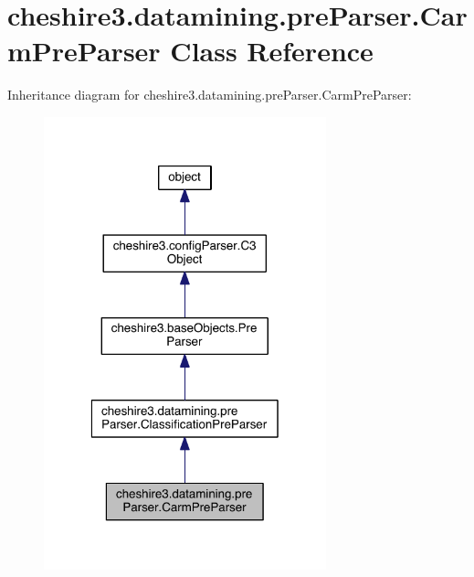\hypertarget{classcheshire3_1_1datamining_1_1pre_parser_1_1_carm_pre_parser}{\section{cheshire3.\-datamining.\-pre\-Parser.\-Carm\-Pre\-Parser Class Reference}
\label{classcheshire3_1_1datamining_1_1pre_parser_1_1_carm_pre_parser}
}


Inheritance diagram for cheshire3.\-datamining.\-pre\-Parser.\-Carm\-Pre\-Parser\-:
\nopagebreak
\begin{figure}[H]
\begin{center}
\leavevmode
\includegraphics[width=232pt]{classcheshire3_1_1datamining_1_1pre_parser_1_1_carm_pre_parser__inherit__graph}
\end{center}
\end{figure}


